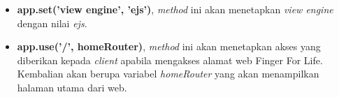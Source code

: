 \begin{enumerate}
\begin{itemize}
		\item \textbf{app.set('view engine', 'ejs')}, \textit{method} ini akan menetapkan \textit{view engine} dengan nilai \textit{ejs}.
		
		\item \textbf{app.use('/', homeRouter)}, \textit{method} ini akan menetapkan akses yang diberikan kepada \textit{client} apabila mengakses alamat web Finger For Life. Kembalian akan berupa variabel \textit{homeRouter} yang akan menampilkan halaman utama dari web.
	\end{itemize}
	
	
	
\end{enumerate}